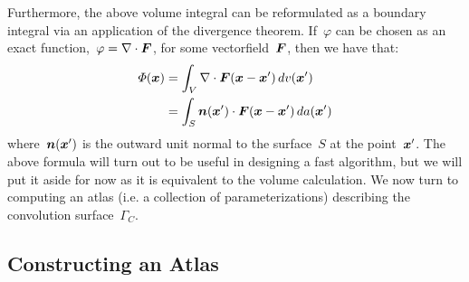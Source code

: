 \documentclass[11pt]{article}
\numberwithin{equation}{section}
\newcommand{\vct}{\vectorsym}
\newcommand\bx{\vct{x}}
\newcommand\bn{\boldsymbol n}
\renewcommand{\phi}{\varphi}
\begin{document}
Furthermore, the above volume integral can be reformulated as a
boundary integral via an application of the divergence
theorem. If~$\phi$ can be chosen as an exact
function,~$\phi = \nabla \cdot \vct{F}$, for some
vectorfield~$\vct{F}$, then we have that:
\begin{equation}
  \begin{aligned}
    \Phi(\bx) &= \int_{V} \nabla \cdot \vct{F}(\bx-\bx') \, dv(\bx') \\
    &= \int_{S} \bn(\bx') \cdot \vct{F}(\bx-\bx') \, da(\bx')
  \end{aligned}
\end{equation}
where~$\bn(\bx')$ is the outward unit normal to the surface~$S$ at the
point~$\bx'$. The above formula will turn out to be useful in
designing a fast algorithm, but we will put it aside for now as it is
equivalent to the volume calculation. We now turn to computing an
atlas (i.e. a collection of parameterizations) describing the
convolution surface~$\Gamma_C$.





\subsection{Constructing an Atlas}
\end{document}
